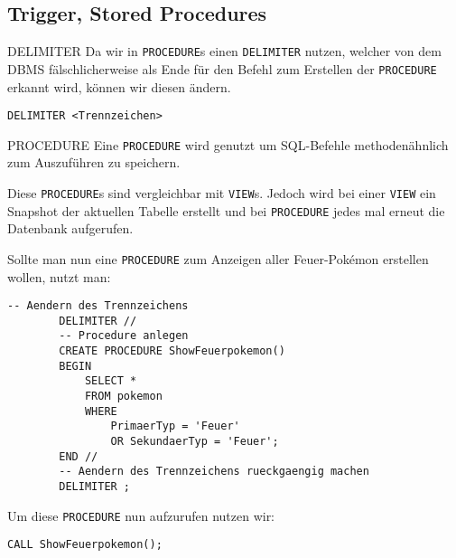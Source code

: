\subsection{Trigger, Stored Procedures}

\begin{sql}{DELIMITER}
    Da wir in \texttt{PROCEDURE}s einen \texttt{DELIMITER} nutzen, welcher von dem DBMS fälschlicherweise als Ende für den Befehl zum Erstellen der \texttt{PROCEDURE} erkannt wird, können wir diesen ändern.

    \begin{lstlisting}[language=mysql]
        DELIMITER <Trennzeichen>
    \end{lstlisting}
\end{sql}

\begin{sql}{PROCEDURE}
    Eine \texttt{PROCEDURE} wird genutzt um SQL-Befehle methodenähnlich zum Auszuführen zu speichern.

    Diese \texttt{PROCEDURE}s sind vergleichbar mit \texttt{VIEW}s.
    Jedoch wird bei einer \texttt{VIEW} ein Snapshot der aktuellen Tabelle erstellt und bei \texttt{PROCEDURE} jedes mal erneut die Datenbank aufgerufen.

    Sollte man nun eine \texttt{PROCEDURE} zum Anzeigen aller Feuer-Pokémon erstellen wollen, nutzt man:

    \begin{lstlisting}[language=mysql]
        -- Aendern des Trennzeichens
        DELIMITER //
        -- Procedure anlegen
        CREATE PROCEDURE ShowFeuerpokemon()
        BEGIN
            SELECT *
            FROM pokemon
            WHERE
                PrimaerTyp = 'Feuer'
                OR SekundaerTyp = 'Feuer';
        END //
        -- Aendern des Trennzeichens rueckgaengig machen
        DELIMITER ;
    \end{lstlisting}

    Um diese \texttt{PROCEDURE} nun aufzurufen nutzen wir:

    \begin{lstlisting}[language=mysql]
        CALL ShowFeuerpokemon();
    \end{lstlisting}


\end{sql}

